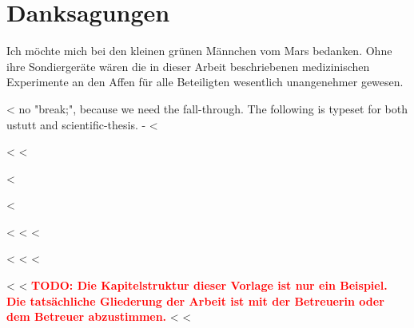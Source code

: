 {{%
\chapter*{Danksagungen}
Ich möchte mich bei den kleinen grünen Männchen vom Mars bedanken.
Ohne ihre Sondiergeräte wären die in dieser Arbeit beschriebenen medizinischen Experimente an den Affen für alle Beteiligten wesentlich unangenehmer gewesen.
\clearpage

<%
no "break;", because we need the fall-through.
The following is typeset for both ustutt and scientific-thesis.
-%
<%


%
%
\tableofcontents

<%
<%

<%

\renewcommand*{\chapterpagestyle}{scrplain}
\pagestyle{scrheadings}
<%

\tableofcontents
<%
<%
\mainmatter
<%

<%
<%
<%

<%
<%
\textbf{\textcolor{red}{TODO: Die Kapitelstruktur dieser Vorlage ist nur ein Beispiel. Die tatsächliche Gliederung der Arbeit ist mit der Betreuerin oder dem Betreuer abzustimmen.}}
<%
<%

}}
